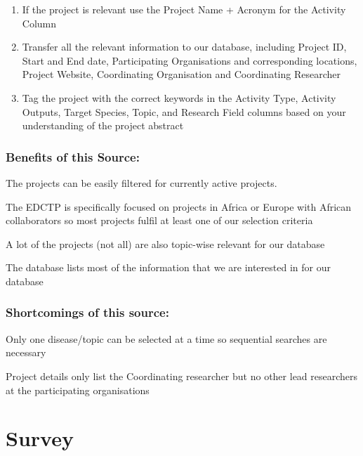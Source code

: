 \documentclass[
]{book}
\begin{document}
\begin{enumerate}
\def\labelenumi{\arabic{enumi}.}
\setcounter{enumi}{6}
\item
  If the project is relevant use the Project Name + Acronym for the Activity Column
\item
  Transfer all the relevant information to our database, including Project ID, Start and End date, Participating Organisations and corresponding locations, Project Website, Coordinating Organisation and Coordinating Researcher
\item
  Tag the project with the correct keywords in the Activity Type, Activity Outputs, Target Species, Topic, and Research Field columns based on your understanding of the project abstract
\end{enumerate}

\hypertarget{benefits-of-this-source}{%
\subsection{Benefits of this Source:}\label{benefits-of-this-source}}

The projects can be easily filtered for currently active projects.

The EDCTP is specifically focused on projects in Africa or Europe with African collaborators so most projects fulfil at least one of our selection criteria

A lot of the projects (not all) are also topic-wise relevant for our database

The database lists most of the information that we are interested in for our database

\hypertarget{shortcomings-of-this-source}{%
\subsection{Shortcomings of this source:}\label{shortcomings-of-this-source}}

Only one disease/topic can be selected at a time so sequential searches are necessary

Project details only list the Coordinating researcher but no other lead researchers at the participating organisations

\hypertarget{survey}{%
\chapter{Survey}\label{survey}}

  
\end{document}
